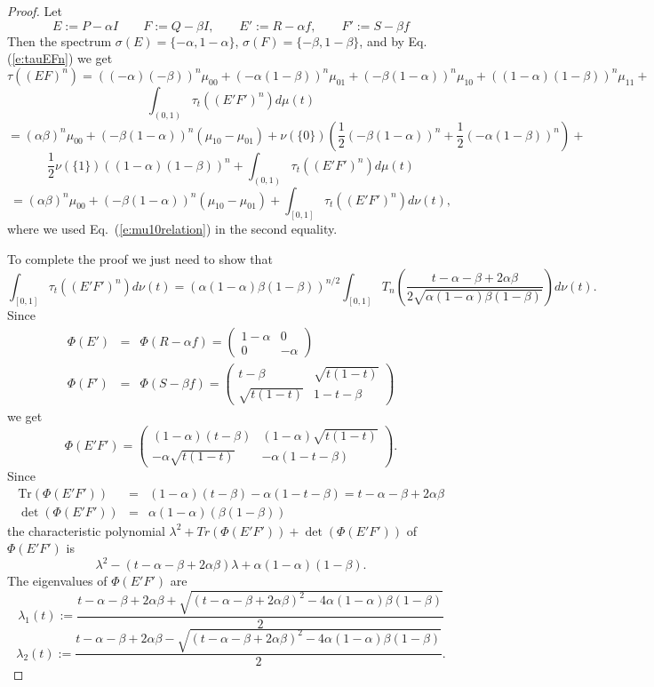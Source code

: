 \documentclass{amsart}
\theoremstyle{definition}
\begin{document}
\begin{proof}
Let
$$E:=P-\alpha I\qquad F:=Q-\beta I,\qquad E':=R-\alpha f,\qquad F':=S-\beta f$$
Then the spectrum $\sigma(E)=\{-\alpha,1-\alpha\}$, $\sigma( F)=\{-\beta,1-\beta\}$, and by Eq.(\ref{e:tauEFn}) we get
$$\tau((E F)^n)=((-\alpha )(-\beta))^n\mu_{00}+(-\alpha (1-\beta))^n\mu_{01}+(-\beta(1-\alpha ))^n\mu_{10}+((1-\alpha )(1-\beta))^n\mu_{11}+$$
$$\int_{(0,1)} \tau_t((E'F')^n)d\mu(t)$$
$$=(\alpha \beta)^n\mu_{00}+(-\beta(1-\alpha ))^n(\mu_{10}-\mu_{01})+\nu(\{0\})(\frac12(-\beta(1-\alpha ))^n+\frac12(-\alpha (1-\beta))^n)+$$
$$\frac12\nu(\{1\})((1-\alpha )(1-\beta))^n+\int_{(0,1)}\tau_t((E'F')^n)d\mu(t)$$
$$=(\alpha \beta)^n\mu_{00}+(-\beta(1-\alpha ))^n(\mu_{10}-\mu_{01})+\int_{[0,1]}\tau_t((E'F')^n)d\nu(t),$$
where we used Eq.~(\ref{e:mu10relation}) in the second equality.

To complete the proof we just need to show that 
$$\int_{[0,1]}\tau_t((E'F')^n)d\nu(t)=(\alpha (1-\alpha )\beta (1-\beta ))^{n/2}\int_{[0,1]}T_n(\frac{t-\alpha -\beta +2\alpha \beta }{2\sqrt{\alpha (1-\alpha )\beta (1-\beta )}})d\nu(t).$$
Since
\begin{eqnarray*}
\Phi(E')&=&\Phi(R-\alpha f)=\left(\begin{array}{cc}
  1-\alpha   & 0   \\
  0 &  -\alpha    
\end{array}
\right)\\
\Phi(F')&=&\Phi(S-\beta f)=\left(\begin{array}{cc}
  t-\beta   & \sqrt{t(1-t)}   \\
  \sqrt{t(1-t)} &  1-t-\beta    
\end{array}
\right)
\end{eqnarray*}
we get
$$\Phi(E'F')=\left(\begin{array}{cc}
  (1-\alpha )(t-\beta )  & (1-\alpha )\sqrt{t(1-t)}   \\
  -\alpha \sqrt{t(1-t)} &  -\alpha (1-t-\beta )   
\end{array}
\right).
$$
Since
\begin{eqnarray*}
\mathrm{Tr}(\Phi(E'F'))&=&(1-\alpha )(t-\beta )-\alpha (1-t-\beta )=t-\alpha -\beta +2\alpha \beta\\
\det(\Phi(E'F'))&=&\alpha (1-\alpha )(\beta (1-\beta ))
\end{eqnarray*}
the characteristic polynomial $\lambda^2+Tr(\Phi(E'F'))+\det(\Phi(E'F'))$ of $\Phi(E'F')$ is 
$$\lambda^2-(t-\alpha -\beta +2\alpha \beta )\lambda+\alpha (1-\alpha )(1-\beta ).$$
The eigenvalues of $\Phi(E'F')$ are
$$\lambda_1(t):=\frac{t-\alpha -\beta +2\alpha \beta +\sqrt{(t-\alpha -\beta +2\alpha \beta )^2-4\alpha (1-\alpha )\beta (1-\beta )}}{2}$$
$$\lambda_2(t):=\frac{t-\alpha -\beta +2\alpha \beta -\sqrt{(t-\alpha -\beta +2\alpha \beta )^2-4\alpha (1-\alpha )\beta (1-\beta )}}{2}.$$



\end{proof}
\end{document}
